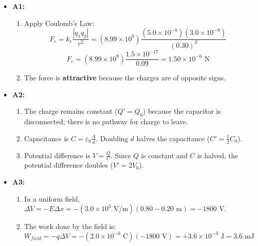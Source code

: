 \vspace{15pt}

\begin{tcolorbox}[
    enhanced,
    colback=lightbg,
    colframe=primary,
    arc=4pt,
    boxrule=1pt,
    left=15pt,
    right=15pt,
    top=12pt,
    bottom=12pt,
    title={\sffamily\bfseries\faLock\quad Answer Key \& Detailed Solutions},
    coltitle=white,
    colbacktitle=primary
]
\begin{itemize}[leftmargin=15pt]
    \item \textbf{A1:} 
    \begin{enumerate}
        \item Apply Coulomb's Law:
        \[ F_e = k_e \frac{|q_1 q_2|}{r^2} = \left(8.99 \times 10^9\right) \frac{(5.0 \times 10^{-9})(3.0 \times 10^{-9})}{(0.30)^2} \]
        \[ F_e = \left(8.99 \times 10^9\right) \frac{1.5 \times 10^{-17}}{0.09} = 1.50 \times 10^{-6}\text{ N} \]
        \item The force is \textbf{attractive} because the charges are of opposite signs.
    \end{enumerate}
    
    \item \textbf{A2:}
    \begin{enumerate}
        \item The charge remains constant ($Q' = Q_0$) because the capacitor is disconnected; there is no pathway for charge to leave.
        \item Capacitance is $C = \varepsilon_0 \frac{A}{d}$. Doubling $d$ halves the capacitance ($C' = \frac{1}{2} C_0$).
        \item Potential difference is $V = \frac{Q}{C}$. Since $Q$ is constant and $C$ is halved, the potential difference doubles ($V' = 2 V_0$).
    \end{enumerate}
    
    \item \textbf{A3:}
    \begin{enumerate}
        \item In a uniform field, $\Delta V = -E \Delta x = -(3.0 \times 10^3\text{ V/m})(0.80 - 0.20\text{ m}) = -1800\text{ V}$.
        \item The work done by the field is:
        \[ W_{field} = -q \Delta V = -(2.0 \times 10^{-6}\text{ C})(-1800\text{ V}) = +3.6 \times 10^{-3}\text{ J} = 3.6\text{ mJ} \]
    \end{enumerate}
\end{itemize}
\end{tcolorbox}
